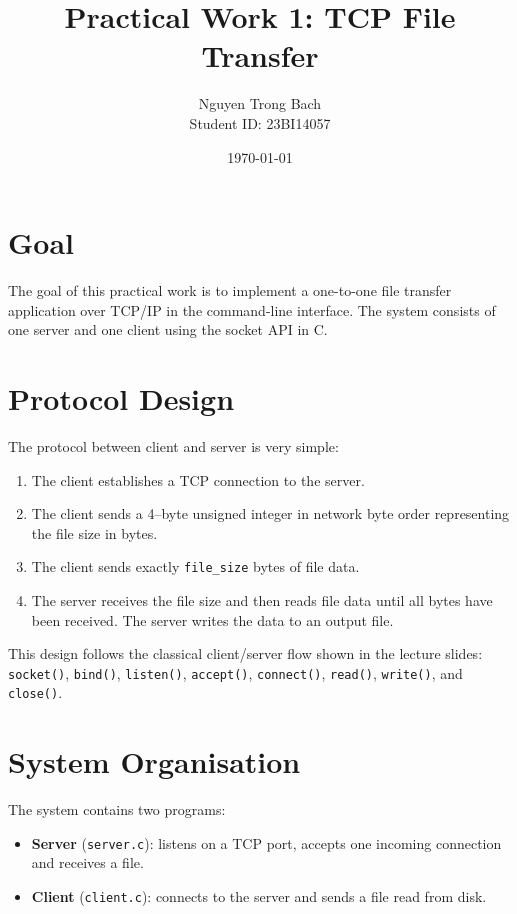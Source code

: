 \documentclass[a4paper,11pt]{article}
\title{Practical Work 1: TCP File Transfer}
\author{Nguyen Trong Bach \\ Student ID: 23BI14057}
\date{\today}
\begin{document}
\maketitle

\section{Goal}

The goal of this practical work is to implement a one-to-one file transfer
application over TCP/IP in the command-line interface.  The system consists of
one server and one client using the socket API in C.

\section{Protocol Design}

The protocol between client and server is very simple:

\begin{enumerate}
  \item The client establishes a TCP connection to the server.
  \item The client sends a 4--byte unsigned integer in network byte order
        representing the file size in bytes.
  \item The client sends exactly \texttt{file\_size} bytes of file data.
  \item The server receives the file size and then reads file data until all
        bytes have been received.  The server writes the data to an output file.
\end{enumerate}

This design follows the classical client/server flow shown in the lecture
slides: \texttt{socket()}, \texttt{bind()}, \texttt{listen()}, \texttt{accept()},
\texttt{connect()}, \texttt{read()}, \texttt{write()}, and \texttt{close()}.

\section{System Organisation}

The system contains two programs:

\begin{itemize}
  \item \textbf{Server} (\texttt{server.c}): listens on a TCP port, accepts one
        incoming connection and receives a file.
  \item \textbf{Client} (\texttt{client.c}): connects to the server and sends a
        file read from disk.
\end{itemize}
\end{document}
